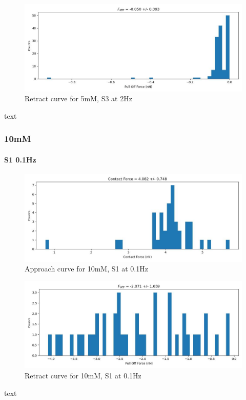 \begin{figure}[h!]
\centering
\includegraphics[width=\textwidth]{chapter7/Tip speed/5mM/S3 2Hz/retract_f_a_hist.jpg}
\caption{Retract curve for 5mM, S3 at 2Hz}
\end{figure}
text
\newpage

\subsubsection*{10mM}
\paragraph{S1 0.1Hz}
\begin{figure}[h!]
\centering
\includegraphics[width=\textwidth]{chapter7/Tip speed/10mM/S1 0.1Hz/approach_f_c_hist.jpg}
\caption{Approach curve for 10mM, S1 at 0.1Hz}
\end{figure}

\begin{figure}[h!]
\centering
\includegraphics[width=\textwidth]{chapter7/Tip speed/10mM/S1 0.1Hz/retract_f_a_hist.jpg}
\caption{Retract curve for 10mM, S1 at 0.1Hz}
\end{figure}
text
\newpage

